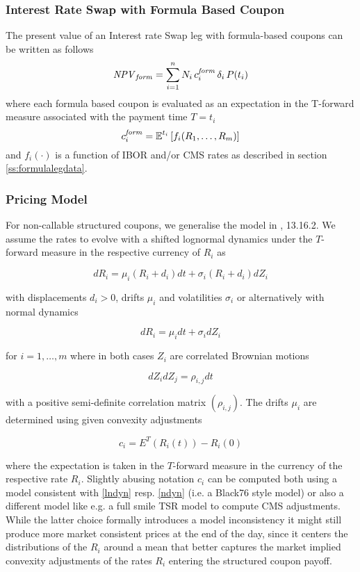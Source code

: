 \subsubsection{Interest Rate Swap with Formula Based Coupon}
\label{pricing:ir_formulacouponirs}

The present value of an Interest rate Swap leg with formula-based
coupons can be written as follows
$$
\mathit{NPV}_{\mathit{form}} = \sum_{i=1}^{n} N_i \, c_i^{\mathit{form}} \,\delta_i\, P(t_i)
$$
where each formula based coupon is evaluated as an expectation in the
T-forward measure associated with the payment time $T=t_i$
$$
c_i^{\mathit{form}} = \operatorname{\mathbb{E}}^{t_i}\left[ f_i(R_1, \dots, R_m)\right]
$$
and $f_i(\cdot)$ is a function of IBOR and/or CMS rates as described in
section \ref{ss:formulalegdata}.
 

\subsubsection*{Pricing Model}

For non-callable structured coupons, we generalise the model in
\cite{Brigo_Mercurio_2006}, 13.16.2. We assume the rates
to evolve with a shifted lognormal dynamics under the $T$-forward
measure in the respective currency of $R_i$ as

\begin{equation}\label{lndyn} dR_i = \mu_i (R_i + d_i) dt + \sigma_i
(R_i + d_i) dZ_i
\end{equation}

with displacements $d_i>0$, drifts $\mu_i$ and volatilities $\sigma_i$
or alternatively with normal dynamics

\begin{equation}\label{ndyn} dR_i = \mu_i dt + \sigma_i dZ_i
\end{equation}

for $i=1,\ldots,m$ where in both cases $Z_i$ are correlated Brownian
motions

\begin{equation*} 
dZ_i dZ_j = \rho_{i,j} dt
\end{equation*}

with a positive semi-definite correlation matrix $( \rho_{i,j})$. The
drifts $\mu_i$ are determined using given convexity adjustments

\begin{equation*} 
c_i = E^T(R_i(t)) - R_i(0)
\end{equation*}

where the expectation is taken in the $T$-forward measure in the
currency of the respective rate $R_i$. Slightly abusing notation $c_i$
can be computed both using a model consistent with \ref{lndyn}
resp. \ref{ndyn} (i.e. a Black76 style model) or also a different
model like e.g. a full smile TSR model to compute CMS
adjustments. While the latter choice formally introduces a model
inconsistency it might still produce more market consistent prices at
the end of the day, since it centers the distributions of the $R_i$
around a mean that better captures the market implied convexity
adjustments of the rates $R_i$ entering the structured coupon payoff.

